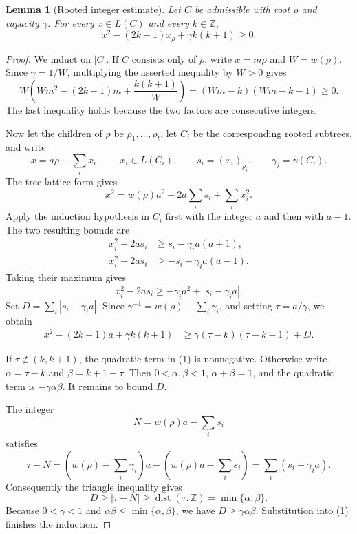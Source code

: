 \documentclass[11pt]{article}
\newtheorem{lemma}[theorem]{Lemma}
\begin{document}
\begin{lemma}[Rooted integer estimate]\label{lem:rooted-estimate}
Let $C$ be admissible with root $\rho$ and capacity $\gamma$.  For every
$x\in L(C)$ and every $k\in\mathbb Z$,
\[
 x^2-(2k+1)x_\rho+\gamma k(k+1)\geq0.
\]
\end{lemma}

\begin{proof}
We induct on $|C|$.  If $C$ consists only of $\rho$, write $x=m\rho$ and
$W=w(\rho)$.  Since $\gamma=1/W$, multiplying the asserted inequality by
$W>0$ gives
\[
 W\left(Wm^2-(2k+1)m+\frac{k(k+1)}W\right)
 =(Wm-k)(Wm-k-1)\geq0.
\]
The last inequality holds because the two factors are consecutive integers.

Now let the children of $\rho$ be $\rho_1,\ldots,\rho_t$, let $C_i$ be the
corresponding rooted subtrees, and write
\[
 x=a\rho+\sum_i x_i,\qquad x_i\in L(C_i),\qquad
 s_i=(x_i)_{\rho_i},\qquad\gamma_i=\gamma(C_i).
\]
The tree-lattice form gives
\[
 x^2=w(\rho)a^2-2a\sum_i s_i+\sum_i x_i^2.
\]
Apply the induction hypothesis in $C_i$ first with the integer $a$ and then
with $a-1$.  The two resulting bounds are
\begin{align*}
 x_i^2-2as_i&\geq s_i-\gamma_i a(a+1),\\
 x_i^2-2as_i&\geq-s_i-\gamma_i a(a-1).
\end{align*}
Taking their maximum gives
\[
 x_i^2-2as_i\geq-\gamma_i a^2+|s_i-\gamma_i a|.
\]
Set $D=\sum_i|s_i-\gamma_i a|$.  Since
$\gamma^{-1}=w(\rho)-\sum_i\gamma_i$, and setting $\tau=a/\gamma$, we obtain
\begin{align*}
 x^2-(2k+1)a+\gamma k(k+1)
 &\geq \gamma(\tau-k)(\tau-k-1)+D. \tag{1}
\end{align*}

If $\tau\notin(k,k+1)$, the quadratic term in (1) is nonnegative.  Otherwise
write $\alpha=\tau-k$ and $\beta=k+1-\tau$.  Then
$0<\alpha,\beta<1$, $\alpha+\beta=1$, and the quadratic term is
$-\gamma\alpha\beta$.  It remains to bound $D$.

The integer
\[
 N=w(\rho)a-\sum_i s_i
\]
satisfies
\[
 \tau-N
 =\left(w(\rho)-\sum_i\gamma_i\right)a
   -\left(w(\rho)a-\sum_i s_i\right)
 =\sum_i(s_i-\gamma_i a).
\]
Consequently the triangle inequality gives
\[
 D\geq|\tau-N|\geq\operatorname{dist}(\tau,\mathbb Z)
 =\min\{\alpha,\beta\}.
\]
Because $0<\gamma<1$ and
$\alpha\beta\leq\min\{\alpha,\beta\}$, we have
$D\geq\gamma\alpha\beta$.  Substitution into (1) finishes the induction.
\end{proof}
\end{document}
